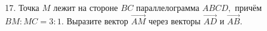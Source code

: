 17. Точка $M$ лежит на стороне $BC$ параллелограмма $ABCD,$ причём $BM:MC=3:1.$ Выразите вектор $\overrightarrow{AM}$ через векторы $\overrightarrow{AD}$ и $\overrightarrow{AB}.$\\
